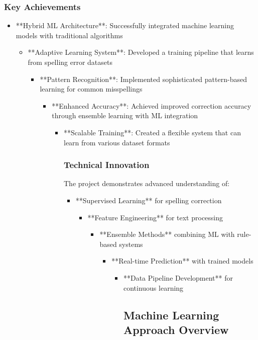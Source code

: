 \documentclass[12pt,a4paper]{article}
\begin{document}
\begin{enumerate}
\begin{enumerate}
\begin{enumerate}
\begin{enumerate}
\begin{enumerate}
\begin{enumerate}
\begin{enumerate}
\begin{enumerate}
\begin{enumerate}
\subsubsection{Key Achievements}


\begin{itemize}
\item **Hybrid ML Architecture**: Successfully integrated machine learning models with traditional algorithms
\begin{itemize}
\item **Adaptive Learning System**: Developed a training pipeline that learns from spelling error datasets
\begin{itemize}
\item **Pattern Recognition**: Implemented sophisticated pattern-based learning for common misspellings
\begin{itemize}
\item **Enhanced Accuracy**: Achieved improved correction accuracy through ensemble learning with ML integration
\begin{itemize}
\item **Scalable Training**: Created a flexible system that can learn from various dataset formats

\subsubsection{Technical Innovation}


The project demonstrates advanced understanding of:

\begin{itemize}
\item **Supervised Learning** for spelling correction
\begin{itemize}
\item **Feature Engineering** for text processing
\begin{itemize}
\item **Ensemble Methods** combining ML with rule-based systems
\begin{itemize}
\item **Real-time Prediction** with trained models
\begin{itemize}
\item **Data Pipeline Development** for continuous learning


\subsection{Machine Learning Approach Overview}



\end{itemize}
\end{itemize}
\end{itemize}
\end{itemize}
\end{itemize}
\end{itemize}
\end{itemize}
\end{itemize}
\end{itemize}
\end{itemize}
\end{enumerate}
\end{enumerate}
\end{enumerate}
\end{enumerate}
\end{enumerate}
\end{enumerate}
\end{enumerate}
\end{enumerate}
\end{enumerate}
\end{document}
